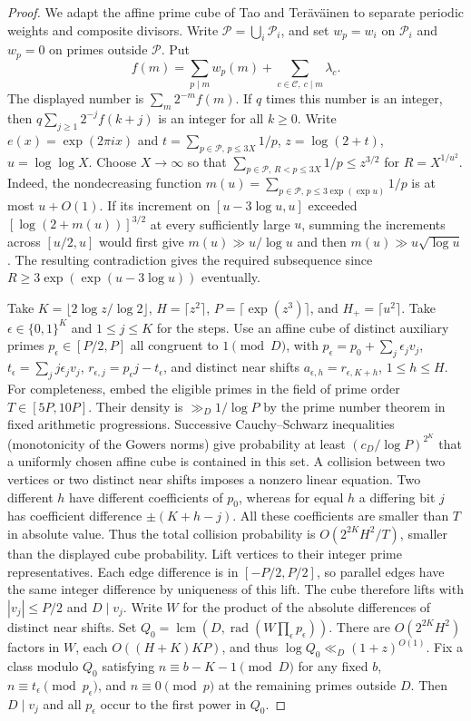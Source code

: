 \documentclass[11pt,letterpaper]{article}
\begin{document}
\begin{proof}
We adapt the affine prime cube of Tao and Ter\"av\"ainen \cite[Section~5]{tt} to separate periodic weights and composite divisors. Write
$\mathcal P=\bigcup_i\mathcal P_i$, and set $w_p=w_i$ on $\mathcal P_i$
and $w_p=0$ on primes outside $\mathcal P$. Put
\[
 f(m)=\sum_{p\mid m}w_p(m)+\sum_{c\in\mathcal C,\ c\mid m}\lambda_c .
\]
The displayed number is $\sum_m2^{-m}f(m)$. If $q$ times this number
is an integer, then $q\sum_{j\ge1}2^{-j}f(k+j)$ is an integer for
all $k\ge0$. Write $e(x)=\exp(2\pi i x)$ and
$t=\sum_{p\in\mathcal P,\,p\le3X}1/p$, $z=\log(2+t)$,
$u=\log\log X$. Choose $X\to\infty$
so that $\sum_{p\in\mathcal P,\,R<p\le3X}1/p\le z^{3/2}$ for
$R=X^{1/u^2}$. Indeed, the nondecreasing function
$m(u)=\sum_{p\in\mathcal P,\,p\le3\exp(\exp u)}1/p$ is at most $u+O(1)$.
If its increment on $[u-3\log u,u]$ exceeded $[\log(2+m(u))]^{3/2}$
at every sufficiently large $u$, summing the increments across $[u/2,u]$
would first give $m(u)\gg u/\log u$ and then $m(u)\gg u\sqrt{\log u}$.
The resulting contradiction gives the required subsequence since
$R\ge3\exp(\exp(u-3\log u))$ eventually.

Take $K=\lfloor2\log z/\log 2\rfloor$, $H=\lceil z^2\rceil$,
$P=\lceil\exp(z^3)\rceil$, and $H_+=\lceil u^2\rceil$. Take $\epsilon\in\{0,1\}^K$ and $1\le j\le K$ for the steps. Use an
affine cube of distinct auxiliary primes $p_\epsilon\in[P/2,P]$ all
congruent to $1\pmod D$, with
$p_\epsilon=p_0+\sum_j\epsilon_jv_j$, $t_\epsilon=\sum_j j\epsilon_jv_j$,
$r_{\epsilon,j}=p_\epsilon j-t_\epsilon$, and distinct near shifts
$a_{\epsilon,h}=r_{\epsilon,K+h}$, $1\le h\le H$.
For completeness, embed the eligible primes in the field of prime
order $T\in[5P,10P]$. Their density is $\gg_D1/\log P$ by the prime
number theorem in fixed arithmetic progressions. Successive
Cauchy--Schwarz inequalities (monotonicity of the Gowers norms) give
probability at least $(c_D/\log P)^{2^K}$ that a uniformly chosen affine
cube is contained in this set. A collision between two vertices or
two distinct near shifts imposes a nonzero linear equation. Two
different $h$ have different coefficients of $p_0$, whereas for equal
$h$ a differing bit $j$ has coefficient difference $\pm(K+h-j)$.
All these coefficients are smaller than $T$ in absolute value. Thus
the total collision probability is $O(2^{2K}H^2/T)$, smaller than the
displayed cube probability. Lift vertices to their integer prime
representatives. Each edge difference is in $[-P/2,P/2]$, so parallel
edges have the same integer difference by uniqueness of this lift.
The cube therefore lifts with $|v_j|\le P/2$ and $D\mid v_j$. Write $W$ for
the product of the absolute differences of distinct near shifts. Set
$Q_0=\operatorname{lcm}(D,\operatorname{rad}(W\prod_\epsilon p_\epsilon))$.
There are $O(2^{2K}H^2)$ factors in $W$, each
$O((H+K)KP)$, and thus $\log Q_0\ll_D (1+z)^{O(1)}$.
Fix a class modulo $Q_0$ satisfying $n\equiv b-K-1\pmod D$ for any
fixed $b$, $n\equiv t_\epsilon\pmod{p_\epsilon}$, and $n\equiv0\pmod p$
at the remaining primes outside $D$. Then $D\mid v_j$ and all
$p_\epsilon$ occur to the first power in $Q_0$.


\end{proof}
\end{document}
